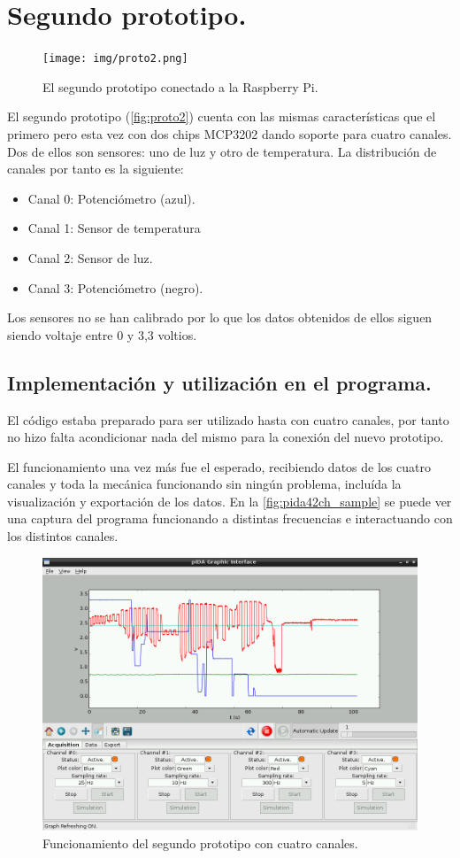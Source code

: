 		\section{Segundo prototipo.}
			\begin{figure}[H]
			\centering
		  	\texttt{[image: img/proto2.png]}
  			\caption{El segundo prototipo conectado a la Raspberry Pi.}\label{fig:proto2}
		\end{figure}
		El segundo prototipo (\autoref{fig:proto2}) cuenta con las mismas características que el primero pero esta vez con dos chips MCP3202 dando soporte para cuatro canales. Dos de ellos son sensores: uno de luz y otro de temperatura. La distribución de canales por tanto es la siguiente:
		\begin{itemize}
			\item Canal 0: Potenciómetro (azul).
			\item Canal 1: Sensor de temperatura
			\item Canal 2: Sensor de luz.
			\item Canal 3: Potenciómetro (negro).
		\end{itemize}

		Los sensores no se han calibrado por lo que los datos obtenidos de ellos siguen siendo voltaje entre 0 y 3,3 voltios.
		
		\subsection{Implementación y utilización en el programa.}
		El código estaba preparado para ser utilizado hasta con cuatro canales, por tanto no hizo falta acondicionar nada del mismo para la conexión del nuevo prototipo.
		
		El funcionamiento una vez más fue el esperado, recibiendo datos de los cuatro canales y toda la mecánica funcionando sin ningún problema, incluída la visualización y exportación de los datos. 
		En la \autoref{fig:pida42ch_sample} se puede ver una captura del programa funcionando a distintas frecuencias e interactuando con los distintos canales.
		
			\begin{figure}[H]
			\centering
		  	\includegraphics[width=1\textwidth]{img/pida_4ch_sample.png}
  			\caption{Funcionamiento del segundo prototipo con cuatro canales.}\label{fig:pida42ch_sample}
		\end{figure}